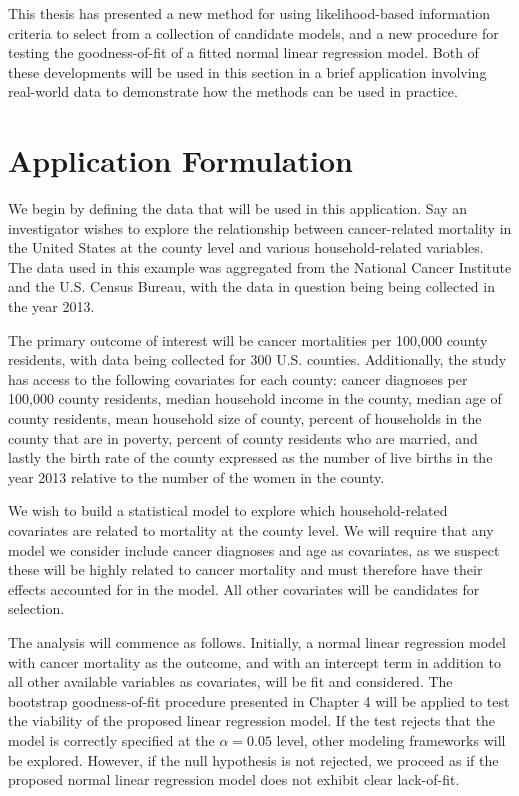 \doublespace
{}

		This thesis has presented a new method for using likelihood-based information criteria to select from a collection of candidate models, and a new procedure
		for testing the goodness-of-fit of a fitted normal linear regression model. Both of these developments will be used in this section in a brief application
		involving real-world data to demonstrate how the methods can be used in practice.

		\section{Application Formulation} \label{sec:app_form}

		We begin by defining the data that will be used in this application. Say an investigator wishes to explore the relationship between cancer-related mortality in
		the United States at the county level and various household-related variables. The data used in this example was aggregated from the National Cancer Institute
		and the U.S. Census Bureau, with the data in question being being collected in the year 2013.
		
		The primary outcome of interest will be cancer mortalities per 100,000 county residents, with data being collected for 300 U.S. counties. Additionally, the study has access to the
		following covariates for each county: cancer diagnoses per 100,000 county residents, median household income in the county, median age of county residents, mean
		household size of county, percent of households in the county that are in poverty, percent of county residents who are married, and lastly the birth rate of the county expressed
		as the number of live births in the year 2013 relative to the number of the women in the county.

		We wish to build a statistical model to explore which household-related covariates are related to mortality at the county level. We will require that any model we
		consider include cancer diagnoses and age as covariates, as we suspect these will be highly related to cancer mortality and must therefore have their effects
		accounted for in the model. All other covariates will be candidates for selection.

		The analysis will commence as follows. Initially, a normal linear regression model with cancer mortality as the outcome, and with an intercept term in addition to all
		other available variables as covariates, will be fit and considered. The bootstrap goodness-of-fit procedure presented in Chapter 4 will be applied to test the 
		viability of the proposed linear regression model. If the test rejects that the model is correctly specified at the $\alpha = 0.05$ level, other modeling frameworks
		will be explored. However, if the null hypothesis is not rejected, we proceed as if the proposed normal linear regression model does not exhibit clear lack-of-fit.


